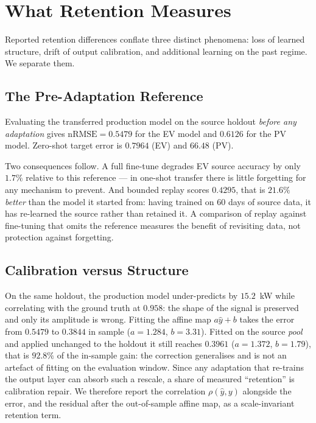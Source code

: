 \documentclass[journal]{IEEEtran}
\newcommand{\nrmse}{\mathrm{nRMSE}}
\begin{document}
\section{What Retention Measures}
\label{sec:protocol}

Reported retention differences conflate three distinct phenomena: loss of
learned structure, drift of output calibration, and additional learning on the
past regime. We separate them.

\subsection{The Pre-Adaptation Reference}
Evaluating the transferred production model on the source holdout \emph{before
any adaptation} gives $\nrmse = 0.5479$ for the EV model and $0.6126$ for the
PV model. Zero-shot target error is $0.7964$ (EV) and $66.48$ (PV).

Two consequences follow. A full fine-tune degrades EV source accuracy by only
$1.7\%$ relative to this reference --- in one-shot transfer there is little
forgetting for any mechanism to prevent. And bounded replay scores $0.4295$,
that is $21.6\%$ \emph{better} than the model it started from: having trained on
$60$ days of source data, it has re-learned the source rather than retained it.
A comparison of replay against fine-tuning that omits the reference measures the
benefit of revisiting data, not protection against forgetting.

\subsection{Calibration versus Structure}
On the same holdout, the production model under-predicts by $15.2$~kW while
correlating with the ground truth at $0.958$: the shape of the signal is
preserved and only its amplitude is wrong. Fitting the affine map $a\hat{y}+b$
takes the error from $0.5479$ to $0.3844$ in sample ($a{=}1.284$, $b{=}3.31$).
Fitted on the source \emph{pool} and applied unchanged to the holdout it still
reaches $0.3961$ ($a{=}1.372$, $b{=}1.79$), that is $92.8\%$ of the in-sample
gain: the correction generalises and is not an artefact of fitting on the
evaluation window. Since any adaptation that re-trains the output layer can
absorb such a rescale, a share of measured ``retention'' is calibration repair.
We therefore report the correlation $\rho(\hat{y},y)$ alongside the error, and
the residual after the out-of-sample affine map, as a scale-invariant retention
term.
\end{document}
